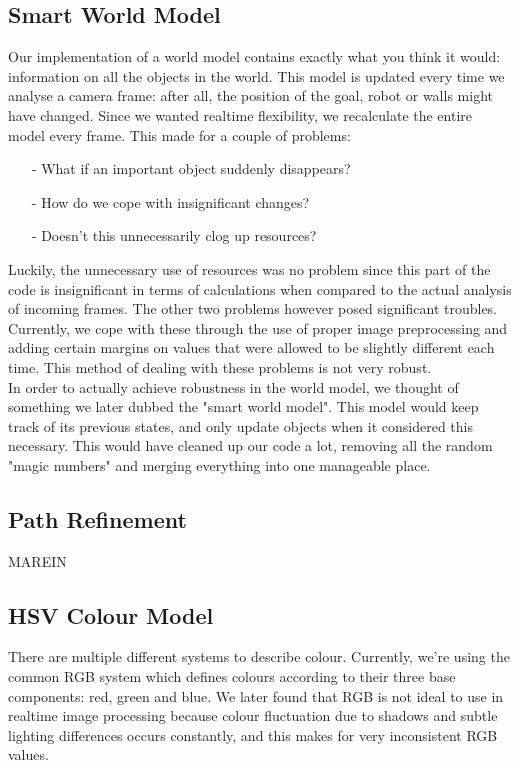 \documentclass[10pt, abstracton, twocolumn]{scrartcl}
\begin{document}
\begin{appendices}
\subsection{Smart World Model}
Our implementation of a world model contains exactly what you think it would: information on all the objects in the world. This model is updated every time we analyse a camera frame: after all, the position of the goal, robot or walls might have changed. Since we wanted realtime flexibility, we recalculate the entire model every frame. This made for a couple of problems:
\begin{itemize}
\item[-] What if an important object suddenly disappears?
\item[-] How do we cope with insignificant changes?
\item[-] Doesn't this unnecessarily clog up resources?
\end{itemize}
Luckily, the unnecessary use of resources was no problem since this part of the code is insignificant in terms of calculations when compared to the actual analysis of incoming frames. The other two problems however posed significant troubles. Currently, we cope with these through the use of proper image preprocessing and adding certain margins on values that were allowed to be slightly different each time. This method of dealing with these problems is not very robust.\\
In order to actually achieve robustness in the world model, we thought of something we later dubbed the "smart world model". This model would keep track of its previous states, and only update objects when it considered this necessary. This would have cleaned up our code a lot, removing all the random "magic numbers" and merging everything into one manageable place.

\subsection{Path Refinement}
\label{sec:pathrefinement}
MAREIN

\subsection{HSV Colour Model}
There are multiple different systems to describe colour. Currently, we're using the common RGB system which defines colours according to their three base components: red, green and blue. We later found that RGB is not ideal to use in realtime image processing because colour fluctuation due to shadows and subtle lighting differences occurs constantly, and this makes for very inconsistent RGB values.


\end{appendices}
\end{document}
